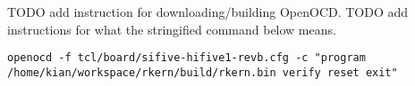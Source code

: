 TODO add instruction for downloading/building OpenOCD.
TODO add instructions for what the stringified command below means.
\begin{lstlisting}
openocd -f tcl/board/sifive-hifive1-revb.cfg -c "program /home/kian/workspace/rkern/build/rkern.bin verify reset exit"
\end{lstlisting}